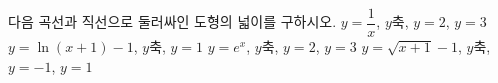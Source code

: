 다음 곡선과 직선으로 둘러싸인 도형의 넓이를 구하시오.
 $y=\dfrac{1}{x}$, $y$축, $y=2$, $y=3$
 $y=\ln (x+1)-1$, $y$축, $y=1$
 $y=e^x$, $y$축, $y=2$, $y=3$
 $y=\sqrt{x+1}-1$, $y$축, $y=-1$, $y=1$
